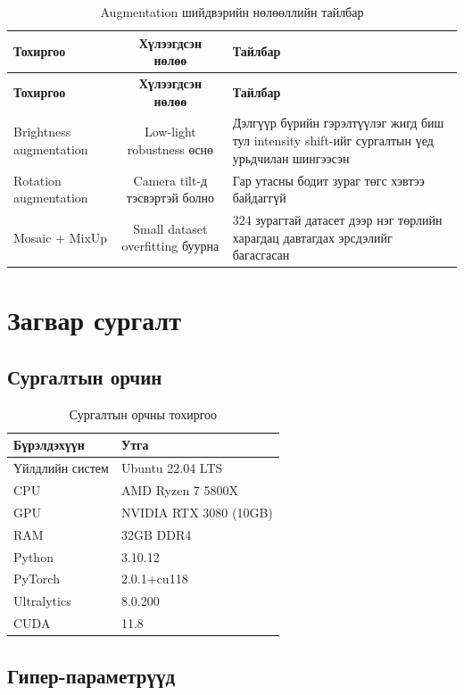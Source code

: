 \begin{longtable}{|p{4.2cm}|c|p{5.4cm}|}
\caption{Augmentation шийдвэрийн нөлөөллийн тайлбар}
\label{tab:augmentation_rationale_effect} \\
\hline
\textbf{Тохиргоо} & \textbf{Хүлээгдсэн нөлөө} & \textbf{Тайлбар} \\
\hline
\endfirsthead
\hline
\textbf{Тохиргоо} & \textbf{Хүлээгдсэн нөлөө} & \textbf{Тайлбар} \\
\hline
\endhead
\hline
\endfoot
Brightness augmentation & Low-light robustness өснө & Дэлгүүр бүрийн гэрэлтүүлэг жигд биш тул intensity shift-ийг сургалтын үед урьдчилан шингээсэн \\
\hline
Rotation augmentation & Camera tilt-д тэсвэртэй болно & Гар утасны бодит зураг төгс хэвтээ байдаггүй \\
\hline
Mosaic + MixUp & Small dataset overfitting буурна & 324 зурагтай датасет дээр нэг төрлийн харагдац давтагдах эрсдэлийг багасгасан \\
\hline
\end{longtable}

\section{Загвар сургалт}

\subsection{Сургалтын орчин}

\begin{table}[H]
\centering
\caption{Сургалтын орчны тохиргоо}
\label{tab:training_env}
\begin{tabular}{|l|l|}
\hline
\textbf{Бүрэлдэхүүн} & \textbf{Утга} \\
\hline
Үйлдлийн систем & Ubuntu 22.04 LTS \\
\hline
CPU & AMD Ryzen 7 5800X \\
\hline
GPU & NVIDIA RTX 3080 (10GB) \\
\hline
RAM & 32GB DDR4 \\
\hline
Python & 3.10.12 \\
\hline
PyTorch & 2.0.1+cu118 \\
\hline
Ultralytics & 8.0.200 \\
\hline
CUDA & 11.8 \\
\hline
\end{tabular}
\end{table}

\subsection{Гипер-параметрүүд}

